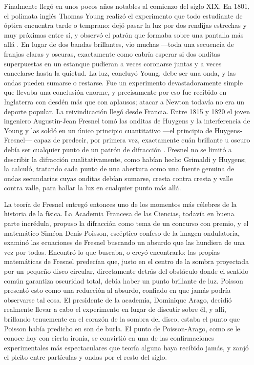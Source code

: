 	Finalmente llegó en unos pocos años notables al comienzo del siglo XIX. En 1801, el polímata inglés Thomas Young realizó el experimento que todo estudiante de óptica encuentra tarde o temprano: dejó pasar la luz por dos rendijas estrechas y muy próximas entre sí, y observó el patrón que formaba sobre una pantalla más allá \cite{young1804bakerian}. En lugar de dos bandas brillantes, vio muchas —toda una secuencia de franjas claras y oscuras, exactamente como cabría esperar si dos onditas superpuestas en un estanque pudieran a veces coronarse juntas y a veces cancelarse hasta la quietud. La luz, concluyó Young, debe ser una onda, y las ondas pueden sumarse o restarse. Fue un experimento devastadoramente simple que llevaba una conclusión enorme, y precisamente por eso fue recibido en Inglaterra con desdén más que con aplausos; atacar a Newton todavía no era un deporte popular. La reivindicación llegó desde Francia. Entre 1815 y 1820 el joven ingeniero Augustin-Jean Fresnel tomó las onditas de Huygens y la interferencia de Young y las soldó en un único principio cuantitativo —el principio de Huygens-Fresnel— capaz de predecir, por primera vez, exactamente cuán brillante u oscuro debía ser cualquier punto de un patrón de difracción \cite{fresnel1819memoire}. Fresnel no se limitó a describir la difracción cualitativamente, como habían hecho Grimaldi y Huygens; la calculó, tratando cada punto de una abertura como una fuente genuina de ondas secundarias cuyas onditas debían sumarse, cresta contra cresta y valle contra valle, para hallar la luz en cualquier punto más allá.

	La teoría de Fresnel entregó entonces uno de los momentos más célebres de la historia de la física. La Academia Francesa de las Ciencias, todavía en buena parte incrédula, propuso la difracción como tema de un concurso con premio, y el matemático Siméon Denis Poisson, escéptico confeso de la imagen ondulatoria, examinó las ecuaciones de Fresnel buscando un absurdo que las hundiera de una vez por todas. Encontró lo que buscaba, o creyó encontrarlo: las propias matemáticas de Fresnel predecían que, justo en el centro de la sombra proyectada por un pequeño disco circular, directamente detrás del obstáculo donde el sentido común garantiza oscuridad total, debía haber un punto brillante de luz. Poisson presentó esto como una reducción al absurdo, confiado en que jamás podría observarse tal cosa. El presidente de la academia, Dominique Arago, decidió realmente llevar a cabo el experimento en lugar de discutir sobre él, y allí, brillando tenuemente en el corazón de la sombra del disco, estaba el punto que Poisson había predicho en son de burla. El punto de Poisson-Arago, como se le conoce hoy con cierta ironía, se convirtió en una de las confirmaciones experimentales más espectaculares que teoría alguna haya recibido jamás, y zanjó el pleito entre partículas y ondas por el resto del siglo.

